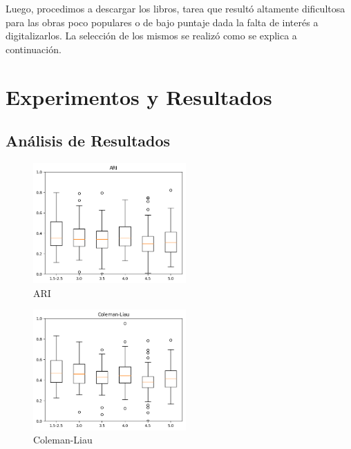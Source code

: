 \documentclass[12pt,journal,compsoc]{IEEEtran}
\begin{document}
Luego, procedimos a descargar los libros, tarea que resultó altamente dificultosa para las obras poco populares o de bajo puntaje dada la falta de interés a digitalizarlos. La selección de los mismos se realizó como se explica a continuación.

\section{Experimentos y Resultados}

\subsection{Análisis de Resultados}

\begin{minipage}{\linewidth}
  \centering
  \begin{minipage}{0.25\linewidth}
      \begin{figure}[H]
          \includegraphics[width=2.3in]{../unigrams/scripts/boxplots/ARI.png}
          \caption{ARI}
      \end{figure}
  \end{minipage}
  \hspace{0.05\linewidth}
  \begin{minipage}{0.25\linewidth}
      \begin{figure}[H]
          \includegraphics[width=2.3in]{../unigrams/scripts/boxplots/Coleman-Liau.png}
          \caption{Coleman-Liau}
      \end{figure}
  \end{minipage}
  \hspace{0.05\linewidth}

\end{minipage}
\end{document}
